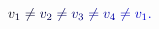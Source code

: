 \documentclass[12pt]{article}
\begin{document}
\makeatletter
\renewcommand*{\@textcolor}[3]{%
  \protect\leavevmode
  \begingroup
    \color#1{#2}#3%
  \endgroup
}
\makeatother
\begin{displaymath}
\mathcolor[RGB]{0,0,15}{v} _ { \mathcolor[RGB]{0,0,30}{1} } \mathcolor[RGB]{0,0,45}{\neq} \mathcolor[RGB]{0,0,60}{v} _ { \mathcolor[RGB]{0,0,75}{2} } \mathcolor[RGB]{0,0,90}{\neq} \mathcolor[RGB]{0,0,105}{v} _ { \mathcolor[RGB]{0,0,120}{3} } \mathcolor[RGB]{0,0,135}{\neq} \mathcolor[RGB]{0,0,150}{v} _ { \mathcolor[RGB]{0,0,165}{4} } \mathcolor[RGB]{0,0,180}{\neq} \mathcolor[RGB]{0,0,195}{v} _ { \mathcolor[RGB]{0,0,210}{1} } \mathcolor[RGB]{0,0,225}{.}
\end{displaymath}
\end{document}
